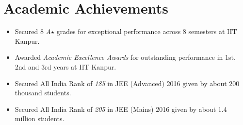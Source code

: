 \section*{Academic Achievements}
\begin{itemize}[itemsep=0mm]

\item Secured 8 \textit{A$\star$} grades for exceptional performance across 8 semesters at IIT Kanpur.
\item Awarded \textit{Academic Excellence Awards} for outstanding performance in 1st, 2nd and 3rd years at IIT Kanpur.
\item Secured All India Rank of \textit{185} in JEE (Advanced) 2016 given by about 200 thousand students.
\item Secured All India Rank of \textit{205} in JEE (Mains) 2016 given by about 1.4 million students.

\end{itemize}
